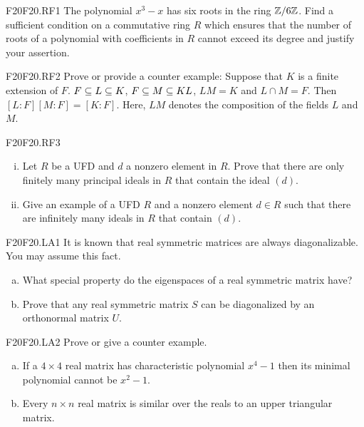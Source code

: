 \documentclass[../AlgebraQualSolutions.tex]{subfiles}
\begin{document}
	
	\begin{prob}{F20}{F20.RF1}
	The polynomial $x^3 - x$ has six roots in the ring $\mathbb{Z}/6\mathbb{Z}$. Find a sufficient condition on a commutative ring $R$ which ensures that the number of roots of a polynomial with coefficients in $R$ cannot exceed its degree and justify your assertion.
	\end{prob}
	
	\begin{prob}{F20}{F20.RF2}
	Prove or provide a counter example: Suppose that $K$ is a finite extension of $F$. $F \subseteq L \subseteq K$, $F \subseteq M \subseteq KL$, $LM = K$ and $L \cap M = F$. Then $[L:F][M:F] = [K:F]$. Here, $LM$ denotes the composition of the fields $L$ and $M$.
	\end{prob}
	
	\begin{prob}{F20}{F20.RF3}
		\begin{enumerate}[(i)]
		\item Let $R$ be a UFD and $d$ a nonzero element in $R$. Prove that there are only finitely many principal ideals  in $R$ that contain the ideal $(d)$.
		\item Give an example of a UFD $R$ and a nonzero element $d \in R$ such that there are infinitely many ideals in $R$ that contain $(d)$.
		\end{enumerate}
	\end{prob}
	
	\begin{prob}{F20}{F20.LA1}
	It is known that real symmetric matrices are always diagonalizable. You may assume this fact.
	\begin{enumerate}[(a)]
	\item What special property do the eigenspaces of a real symmetric matrix have?
	\item Prove that any real symmetric matrix $S$ can be diagonalized by an orthonormal matrix $U$.
	\end{enumerate}
	\end{prob}
	
	\begin{prob}{F20}{F20.LA2}
	Prove or give a counter example.
	\begin{enumerate}[(a)]
	\item If a $4 \times 4$ real matrix has characteristic polynomial $x^4 -1$ then its minimal polynomial cannot be $x^2 - 1$.
	\item Every $n \times n$ real matrix is similar over the reals to an upper triangular matrix.
	\end{enumerate}
	\end{prob}
	
\end{document}
